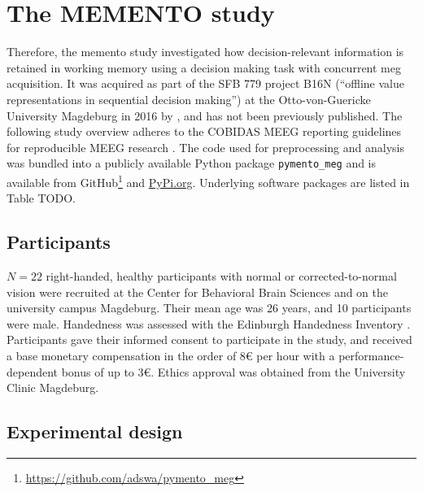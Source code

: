 \section{The MEMENTO study}


Therefore, the memento study investigated how decision-relevant information is retained in working memory using a decision making task with concurrent \gls{meg} acquisition.
It was acquired as part of the SFB 779 project B16N (``offline value representations in sequential decision making'') at the Otto-von-Guericke University Magdeburg in 2016 by \citet{kaiser}, and has not been previously published.
The following study overview adheres to the COBIDAS MEEG reporting guidelines for reproducible MEEG research \citep{pernet2020issues}.
The code used for preprocessing and analysis was bundled into a publicly available Python package \texttt{pymento\_meg} and is available from GitHub\footnote{\url{https://github.com/adswa/pymento_meg}} and \url{PyPi.org}.
Underlying software packages are listed in Table TODO.

\subsection{Participants}

$N = 22$ right-handed, healthy participants with normal or corrected-to-normal vision were recruited at the Center for Behavioral Brain Sciences and on the university campus Magdeburg.
Their mean age was 26 years, and 10 participants were male.
Handedness was assessed with the Edinburgh Handedness Inventory \citep{oldfield1971assessment}.
Participants gave their informed consent to participate in the study, and received a base monetary compensation in the order of 8€ per hour with a performance-dependent bonus of up to 3€.
Ethics approval was obtained from the University Clinic Magdeburg.

\subsection{Experimental design}

